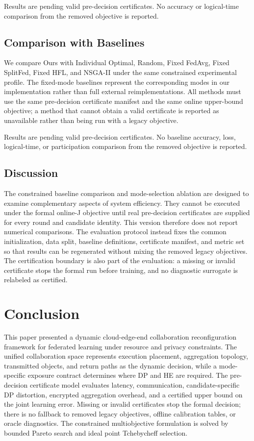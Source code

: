 \documentclass[5p,times]{elsarticle}
\theoremstyle{plain}
\theoremstyle{definition}
\theoremstyle{remark}
\begin{document}
Results are pending valid pre-decision certificates. No accuracy or
logical-time comparison from the removed objective is reported.


\subsection{Comparison with Baselines}
\label{sec:main_comparison}

We compare Ours with Individual Optimal, Random, Fixed FedAvg,
Fixed SplitFed, Fixed HFL, and NSGA-II under the same constrained
experimental profile. The fixed-mode baselines represent the
corresponding modes in our implementation rather than full external
reimplementations. All methods must use the same pre-decision
certificate manifest and the same online upper-bound objective; a method
that cannot obtain a valid certificate is reported as unavailable rather
than being run with a legacy objective.

Results are pending valid pre-decision certificates. No baseline
accuracy, loss, logical-time, or participation comparison from the
removed objective is reported.

\subsection{Discussion}
\label{sec:reconfiguration_behavior}
\label{sec:experiment_limits}
The constrained baseline comparison and mode-selection ablation are
designed to examine complementary aspects of system efficiency. They
cannot be executed under the formal online-J objective until real
pre-decision certificates are supplied for every round and candidate
identity. This version therefore does not report numerical comparisons.
The evaluation protocol instead fixes the common initialization, data
split, baseline definitions, certificate manifest, and metric set so
that results can be regenerated without mixing the removed legacy
objectives. The certification boundary is also part of the evaluation:
a missing or invalid certificate stops the formal run before training,
and no diagnostic surrogate is relabeled as certified.

\section{Conclusion}
\label{sec:conclusion}
This paper presented a dynamic cloud-edge-end collaboration reconfiguration
framework for federated learning under resource and privacy constraints. The
unified collaboration space represents execution placement, aggregation
topology, transmitted objects, and return paths as the dynamic decision, while a
mode-specific exposure contract determines where DP and HE are required. The
pre-decision certificate model evaluates latency, communication,
candidate-specific DP distortion, encrypted aggregation overhead, and a
certified upper bound on the joint learning error. Missing or invalid
certificates stop the formal decision; there is no fallback to removed legacy
objectives, offline calibration tables, or oracle diagnostics. The constrained
multiobjective formulation is solved by bounded Pareto search and ideal point
Tchebycheff selection.
\end{document}
